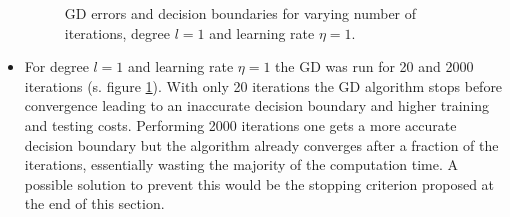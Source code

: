 \documentclass{article}
\begin{document}
\begin{itemize}
\begin{figure}[!ht]
\caption{GD errors and decision boundaries for varying number of iterations, degree $l=1$ and learning rate $\eta=1$.}
\label{logreg2}
\end{figure}

\item For degree $l=1$ and learning rate $\eta=1$ the GD was run for 20 and 2000 iterations (s. figure \ref{logreg2}). With only 20 iterations the GD algorithm stops before convergence leading to an inaccurate decision boundary and higher training and testing costs. Performing 2000 iterations one gets a more accurate decision boundary but the algorithm already converges after a fraction of the iterations, essentially wasting the majority of the computation time. A possible solution to prevent this would be the stopping criterion proposed at the end of this section.


\end{itemize}
\end{document}
